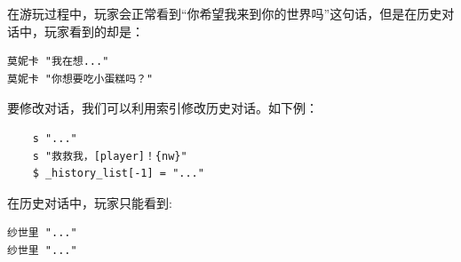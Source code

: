 \documentclass[../../Main.tex]{subfiles}
\begin{document}
在游玩过程中，玩家会正常看到“你希望我来到你的世界吗”这句话，但是在历史对话中，玩家看到的却是：
\begin{lstlisting}
莫妮卡 "我在想..."
莫妮卡 "你想要吃小蛋糕吗？"
\end{lstlisting}

要修改对话，我们可以利用索引修改历史对话。如下例：
\begin{lstlisting}
    s "..."
    s "救救我，[player]！{nw}"
    $ _history_list[-1] = "..."
\end{lstlisting}

在历史对话中，玩家只能看到:
\begin{lstlisting}
纱世里 "..."
纱世里 "..."
\end{lstlisting}
\end{document}
